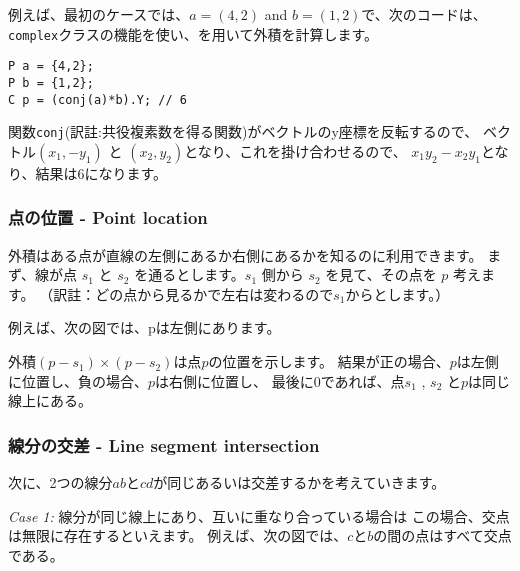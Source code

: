 \noindent
例えば、最初のケースでは、$a=(4,2)$ and $b=(1,2)$で、次のコードは、
\texttt{complex}クラスの機能を使い、を用いて外積を計算します。

\begin{lstlisting}
P a = {4,2};
P b = {1,2};
C p = (conj(a)*b).Y; // 6
\end{lstlisting}

関数\texttt{conj}(訳註:共役複素数を得る関数)がベクトルのy座標を反転するので、
ベクトル$(x_1,-y_1)$ と $(x_2,y_2)$となり、これを掛け合わせるので、
$x_1 y_2 - x_2 y_1$となり、結果は6になります。

\subsubsection{点の位置 - Point location}

外積はある点が直線の左側にあるか右側にあるかを知るのに利用できます。
まず、線が点 $s_1$ と $s_2$ を通るとします。$s_1$ 側から $s_2$ を見て、その点を $p$ 考えます。
（訳註：どの点から見るかで左右は変わるので$s_1$からとします。）

例えば、次の図では、pは左側にあります。

\begin{center}
\end{center}

外積$(p-s_1) \times (p-s_2)$は点$p$の位置を示します。
結果が正の場合、$p$は左側に位置し、負の場合、$p$は右側に位置し、
最後に0であれば、点$s_1$ , $s_2$ と$p$は同じ線上にある。

\subsubsection{線分の交差 - Line segment intersection}


次に、2つの線分$ab$と$cd$が同じあるいは交差するかを考えていきます。

\textit{Case 1:}
線分が同じ線上にあり、互いに重なり合っている場合は
この場合、交点は無限に存在するといえます。
例えば、次の図では、$c$と$b$の間の点はすべて交点である。
\begin{center}
\end{center}

